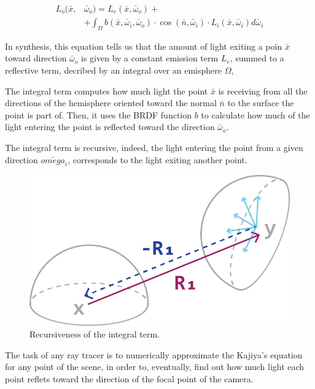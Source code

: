 \documentclass[11pt,a4paper,twocolumn]{article}
\begin{document}
\begin{subequations}
    \begin{align*}
        L_o(\bar{x},&\bar{\omega}_o) = L_e(\bar{x}, \bar{\omega}_o) +\\
        &+\int_\Omega b(\bar{x}, \bar{\omega}_i, \bar{\omega}_o) \cdot \cos(\bar{n}, \bar{\omega}_i) \cdot L_i(\bar{x}, \bar{\omega}_i) d\bar{\omega}_i
    \end{align*}
\end{subequations}

In synthesis, this equation tells us that the amount of light exiting a poin $\bar{x}$ toward direction $\bar{\omega}_o$ is given by a constant emission term $L_e$, summed to a reflective term, decribed by an integral over an emisphere $\Omega$,

The integral term computes how much light the point $\bar{x}$ is receiving from all the directions of the hemisphere oriented toward the normal $\bar{n}$ to the surface the point is part of. Then, it uses the BRDF function $b$ to calculate how much of the light entering the point is reflected toward the direction $\bar{\omega}_o$.

The integral term is recursive, indeed, the light entering the point from a given direction $\bar{omega}_i$, corresponds to the light exiting another point.

\begin{figure}[H]
    \centering
    \includegraphics[width=\textwidth*\real{0.25}]{Images/kajiya_recursive.png}
    \caption{Recursiveness of the integral term.}
    \label{fig:kajiya_recursiveness}
\end{figure}

The task of any ray tracer is to numerically approximate the Kajiya's equation for any point of the scene, in order to, eventually, find out how much light each point reflets toward the direction of the focal point of the camera.
\end{document}
